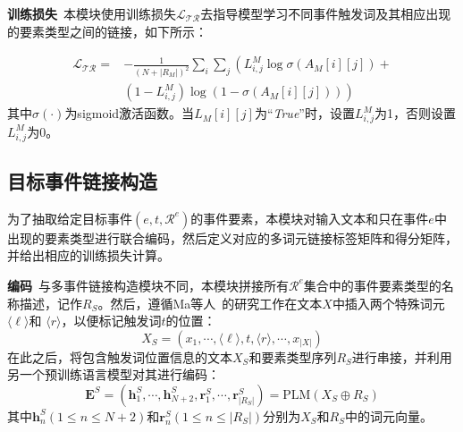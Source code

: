 \textbf{训练损失}~本模块使用训练损失$\mathcal{L_\textrm{TR}}$去指导模型学习不同事件触发词及其相应出现的要素类型之间的链接，如下所示：

\begin{equation}
\begin{split}
    \mathcal{L_\textrm{TR}} = & -\frac{1}{(N+|R_{M}|)^2} \sum_i \sum_j\left(L^{M}_{i,j} \log \sigma\left({A}_{M}[i][j]\right) + \right. \\
    & \left. (1-L^{M}_{i,j}) \log \left(1-\sigma\left({A}_{M}[i][j]\right)\right) \right)
\end{split}
\end{equation}
其中$\sigma(\cdot)$为sigmoid激活函数。当${L}_{M}[i][j]$为“\emph{True}”时，设置$L^{M}_{i,j}$为1，否则设置$L^{M}_{i,j}$为0。

\subsection{目标事件链接构造}
\label{target_event_module}
为了抽取给定目标事件$\left(e,t,\mathcal{R}^{e}\right)$的事件要素，本模块对输入文本和只在事件$e$中出现的要素类型进行联合编码，然后定义对应的多词元链接标签矩阵和得分矩阵，并给出相应的训练损失计算。

\textbf{编码}~与多事件链接构造模块不同，本模块拼接所有$\mathcal{R}^{e}$集合中的事件要素类型的名称描述，记作$R_{S}$。然后，遵循Ma等人~\cite{ma2022prompt}的研究工作在文本$X$中插入两个特殊词元$\langle \ell \rangle$和 $\langle r \rangle$，以便标记触发词$t$的位置：
\begin{equation}
X_{S}=(x_{1},\cdots,\langle \ell \rangle,t,\langle r \rangle,\cdots, x_{|X|})
\end{equation}
在此之后，将包含触发词位置信息的文本$X_{S}$和要素类型序列$R_{S}$进行串接，并利用另一个预训练语言模型对其进行编码：
\begin{equation}
\boldsymbol{E}^{S} = (\boldsymbol{h}_{1}^{S}, \cdots, \boldsymbol{h}_{N+2}^{S}, \boldsymbol{r}_{1}^{S}, \cdots, \boldsymbol{r}_{|R_{S}|}^{S}) =\textrm{PLM}(X_{S} \oplus R_{S})
\end{equation} 
其中$\boldsymbol{h}_{n}^{S} \left(1 \leq n \leq N+2\right)$和$\boldsymbol{r}_{n}^{S} \left(1 \leq n \leq |R_{S}|\right)$分别为$X_{S}$和$R_{S}$中的词元向量。

